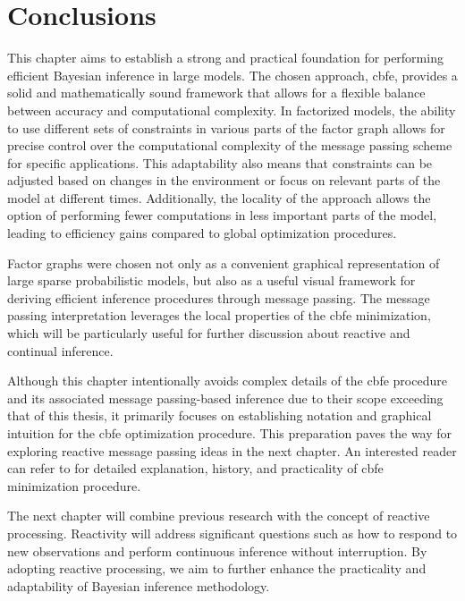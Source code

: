 \section{Conclusions}\label{chapter-02:section:conclusion}

This chapter aims to establish a strong and practical foundation for performing efficient
Bayesian inference in large models.
The chosen approach, \ac{cbfe}, provides a solid and mathematically sound framework that allows for
a flexible balance between accuracy and computational complexity.
In factorized models, the ability to use different sets of constraints in various parts of the
factor graph allows for precise control over the computational complexity of the message
passing scheme for specific applications.
This adaptability also means that constraints can be adjusted based on changes in the
environment or focus on relevant parts of the model at different times.
Additionally, the locality of the approach allows the option of performing fewer computations
in less important parts of the model, leading to efficiency gains compared to global
optimization procedures.

Factor graphs were chosen not only as a convenient graphical representation of large sparse
probabilistic models, but also as a useful visual framework for deriving efficient inference
procedures through message passing.
The message passing interpretation leverages the local properties of the \ac{cbfe} minimization,
which will be particularly useful for further discussion about reactive and continual
inference.

Although this chapter intentionally avoids complex details of the \ac{cbfe} procedure and its
associated message passing-based inference due to their scope exceeding that of this thesis,
it primarily focuses on establishing notation and graphical intuition for the \ac{cbfe}
optimization procedure.
This preparation paves the way for exploring reactive message passing ideas in the next
chapter.
An interested reader can refer to \citep{yedidia_bethe_2001, yedidia_generalized_2002, yedidia_understanding_2001, yedidia_constructing_2005, senoz_variational_2021, senoz_thesis} for detailed explanation, history, and practicality of \ac{cbfe} minimization procedure.

The next chapter will combine previous research with the concept of reactive processing.
Reactivity will address significant questions such as how to respond to new observations and
perform continuous inference without interruption.
By adopting reactive processing, we aim to further enhance the practicality and adaptability
of Bayesian inference methodology.
